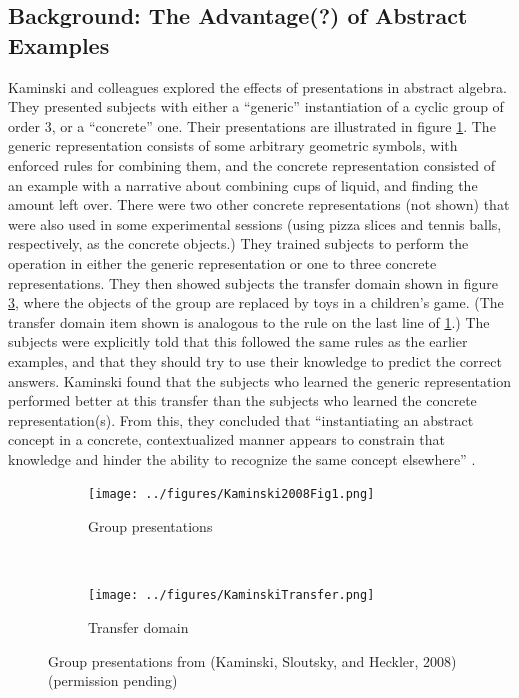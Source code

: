 \documentclass[man,10pt]{apa6}
\begin{document}
\subsection{Background: The Advantage(?) of Abstract Examples}
Kaminski and colleagues \cite{Kaminski2008} explored the effects of presentations in abstract algebra. They presented subjects with either a ``generic'' instantiation of a cyclic group of order 3, or a ``concrete'' one. Their presentations are illustrated in figure \ref{kaminskitraining}. The generic representation consists of some arbitrary geometric symbols, with enforced rules for combining them, and the concrete representation consisted of an example with a narrative about combining cups of liquid, and finding the amount left over. There were two other concrete representations (not shown) that were also used in some experimental sessions (using pizza slices and tennis balls, respectively, as the concrete objects.) They trained subjects to perform the operation in either the generic representation or one to three concrete representations. They then showed subjects the transfer domain shown in figure \ref{kaminskitransfer}, where the objects of the group are replaced by toys in a children's game. (The transfer domain item shown is analogous to the rule on the last line of \ref{kaminskitraining}.) The subjects were explicitly told that this followed the same rules as the earlier examples, and that they should try to use their knowledge to predict the correct answers. Kaminski found that the subjects who learned the generic representation performed better at this transfer than the subjects who learned the concrete representation(s). From this, they concluded that ``instantiating an abstract concept in a concrete, contextualized manner appears to constrain that knowledge and hinder the ability to recognize the same concept elsewhere'' \cite{Kaminski2008}. \par
\begin{figure} \centering \begin{subfigure}{0.5\textwidth} \caption{Group presentations} \label{kaminskitraining} \texttt{[image: ../figures/Kaminski2008Fig1.png]} \end{subfigure} \\ \begin{subfigure}{0.5\textwidth} \caption{Transfer domain} \label{kaminskitransfer} \texttt{[image: ../figures/KaminskiTransfer.png]} \end{subfigure} \caption{Group presentations from (Kaminski, Sloutsky, and Heckler, 2008) (permission pending)} \end{figure}\noindent
\end{document}
